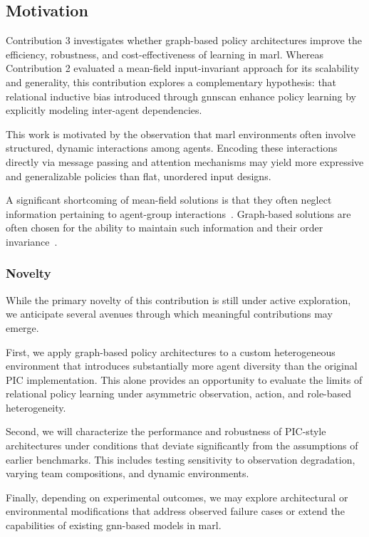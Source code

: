 \subsection{Motivation}

Contribution 3 investigates whether graph-based policy architectures improve 
the efficiency, robustness, and cost-effectiveness of learning in \gls{marl}. 
Whereas Contribution 2 evaluated a mean-field input-invariant approach for its 
scalability and generality, this contribution explores a complementary hypothesis: 
that relational inductive bias introduced through \glspl{gnn}can enhance 
policy learning by explicitly modeling inter-agent dependencies.

This work is motivated by the observation that \gls{marl} environments 
often involve structured, dynamic interactions among agents. 
Encoding these interactions directly via message passing and attention 
mechanisms may yield more expressive and generalizable policies than flat, 
unordered input designs.

A significant shortcoming of mean-field solutions is that they often neglect
information pertaining to agent-group interactions~\cite{yang2021a}.
Graph-based solutions are often chosen for the ability to maintain such information
and their order invariance~\cite{liu2020b, yang2021a}.


\subsubsection{Novelty}

While the primary novelty of this contribution is still under active exploration, 
we anticipate several avenues through which meaningful contributions may emerge.

First, we apply graph-based policy architectures to a custom heterogeneous environment 
that introduces substantially more agent diversity than the original PIC implementation. 
This alone provides an opportunity to evaluate the limits of relational policy learning 
under asymmetric observation, action, and role-based heterogeneity.

Second, we will characterize the performance and robustness of PIC-style architectures 
under conditions that deviate significantly from the assumptions of earlier benchmarks. 
This includes testing sensitivity to observation degradation, varying team compositions, 
and dynamic environments.

Finally, depending on experimental outcomes, we may explore architectural or 
environmental modifications that address observed failure cases or extend the 
capabilities of existing \gls{gnn}-based models in \gls{marl}.

